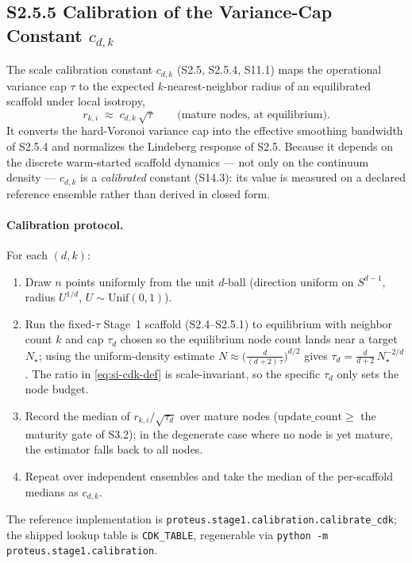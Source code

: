 \documentclass[11pt]{article}
\begin{document}
\subsection*{S2.5.5 Calibration of the Variance-Cap Constant $c_{d,k}$}
\label{sec:si-cdk-calibration}
The scale calibration constant $c_{d,k}$ (S2.5, S2.5.4, S11.1) maps the
operational variance cap $\tau$ to the expected $k$-nearest-neighbor radius of an
equilibrated scaffold under local isotropy,
\[
r_{k,i}\;\approx\;c_{d,k}\,\sqrt{\tau}
\qquad\text{(mature nodes, at equilibrium).}
\label{eq:si-cdk-def}
\]
It converts the hard-Voronoi variance cap into the effective smoothing bandwidth
of S2.5.4 and normalizes the Lindeberg response of S2.5. Because it depends on
the discrete warm-started scaffold dynamics --- not only on the continuum density
--- $c_{d,k}$ is a \emph{calibrated} constant (S14.3): its value is measured on a
declared reference ensemble rather than derived in closed form.

\paragraph{Calibration protocol.}
For each $(d,k)$:
\begin{enumerate}[leftmargin=1.5em]
  \item Draw $n$ points uniformly from the unit $d$-ball (direction uniform on
        $S^{d-1}$, radius $U^{1/d}$, $U\sim\mathrm{Unif}(0,1)$).
  \item Run the fixed-$\tau$ Stage~1 scaffold (S2.4--S2.5.1) to equilibrium with
        neighbor count $k$ and cap $\tau_d$ chosen so the equilibrium node count
        lands near a target $N_\star$; using the uniform-density estimate
        $N\approx\bigl(\tfrac{d}{(d+2)\,\tau}\bigr)^{d/2}$ gives
        $\tau_d=\tfrac{d}{d+2}\,N_\star^{-2/d}$. The ratio in
        \eqref{eq:si-cdk-def} is scale-invariant, so the specific $\tau_d$ only
        sets the node budget.
  \item Record the median of $r_{k,i}/\sqrt{\tau_d}$ over mature nodes
        ($\mathrm{update\_count}\ge$ the maturity gate of S3.2); in the
        degenerate case where no node is yet mature, the estimator falls back to
        all nodes.
  \item Repeat over independent ensembles and take the median of the per-scaffold
        medians as $c_{d,k}$.
\end{enumerate}
The reference implementation is
\texttt{proteus.stage1.calibration.calibrate\_cdk}; the shipped lookup table is
\texttt{CDK\_TABLE}, regenerable via
\texttt{python -m proteus.stage1.calibration}.
\end{document}

